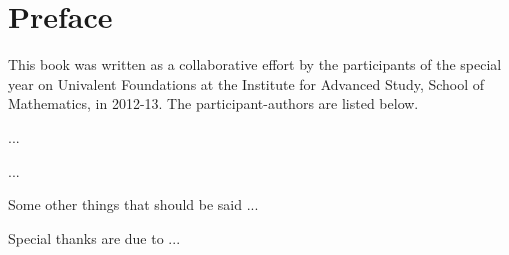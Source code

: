 \chapter*{Preface}
\label{cha:preface}


{%


%

This book was written as a collaborative effort by the participants of the special year on Univalent Foundations at the  Institute for Advanced Study, School of Mathematics, in 2012-13.  The participant-authors are listed below.

...

...

Some other things that should be said ...

Special thanks are due to ...

\bigskip



}%

